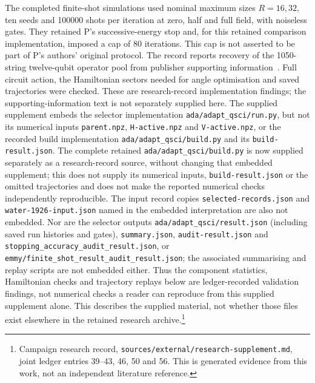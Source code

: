 \documentclass{article}
\newcommand{\record}[1]{\footnote{Campaign research record, \texttt{sources/external/research-supplement.md}, #1. This is generated evidence from this work, not an independent literature reference.}}
\begin{document}
The completed finite-shot simulations used nominal maximum sizes \(R=16,32\), ten seeds and 100000 shots per iteration at zero, half and full field, with noiseless gates. They retained P's successive-energy stop and, for this retained comparison implementation, imposed a cap of 80 iterations. This cap is not asserted to be part of P's authors' original protocol. The record reports recovery of the 1050-string twelve-qubit operator pool from publisher supporting information~\cite{SI,SIfile}. Full circuit action, the Hamiltonian sectors needed for angle optimisation and saved trajectories were checked. These are research-record implementation findings; the supporting-information text is not separately supplied here. The supplied supplement embeds the selector implementation \texttt{ada/adapt\_qsci/run.py}, but not its numerical inputs \texttt{parent.npz}, \texttt{H-active.npz} and \texttt{V-active.npz}, or the recorded build implementation \texttt{ada/adapt\_qsci/build.py} and its \texttt{build-result.json}. The complete retained \texttt{ada/adapt\_qsci/build.py} is now supplied separately as a research-record source, without changing that embedded supplement; this does not supply its numerical inputs, \texttt{build-result.json} or the omitted trajectories and does not make the reported numerical checks independently reproducible. The input record copies \texttt{selected-records.json} and \texttt{water-1926-input.json} named in the embedded interpretation are also not embedded. Nor are the selector outputs \texttt{ada/adapt\_qsci/result.json} (including saved run histories and gates), \texttt{summary.json}, \texttt{audit-result.json} and \texttt{stopping\_accuracy\_audit\_result.json}, or \texttt{emmy/finite\_shot\_result\_audit\_result.json}; the associated summarising and replay scripts are not embedded either. Thus the component statistics, Hamiltonian checks and trajectory replays below are ledger-recorded validation findings, not numerical checks a reader can reproduce from this supplied supplement alone. This describes the supplied material, not whether those files exist elsewhere in the retained research archive.\record{joint ledger entries 39--43, 46, 50 and 56}
\end{document}
